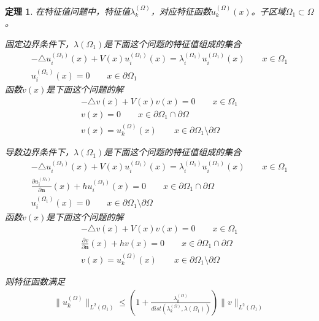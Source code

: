 \documentclass[12pt,a4paper]{article}
\newtheorem{theorem}{定理}
\begin{document}
\begin{theorem}

在特征值问题中，特征值$\lambda_k^{(\Omega)}$，对应特征函数$u_k^{(\Omega)}(x)$。子区域$\Omega_1 \subset \Omega$。

固定边界条件下，$\lambda(\Omega_1)$是下面这个问题的特征值组成的集合
\begin{align}
-\triangle u_i^{(\Omega_1)}(x) + V(x) u_i^{(\Omega_1)}(x) = \lambda_i^{(\Omega_1)} u_i^{(\Omega_1)}(x) \qquad x \in \Omega_1 \\
u_i^{(\Omega_1)}(x) = 0 \qquad x \in \partial \Omega_1
\end{align}
函数$v(x)$是下面这个问题的解
\begin{align}
-\triangle v(x) + V(x) v(x) = 0 \qquad x \in \Omega_1 \\
v(x) = 0 \qquad x \in \partial \Omega_1 \cap \partial \Omega \\
v(x) = u_k^{(\Omega)}(x) \qquad x \in \partial \Omega_1 \setminus \partial \Omega
\end{align}

导数边界条件下，$\lambda(\Omega_1)$是下面这个问题的特征值组成的集合
\begin{align}
-\triangle u_i^{(\Omega_1)}(x) + V(x) u_i^{(\Omega_1)}(x) = \lambda_i^{(\Omega_1)} u_i^{(\Omega_1)}(x) \qquad x \in \Omega_1 \\
\frac{\partial u_i^{(\Omega_1)}}{\partial \mathbf{n}}(x) + h u_i^{(\Omega_1)}(x) = 0 \qquad x \in \partial \Omega_1 \cap \partial \Omega \\
u_i^{(\Omega_1)}(x) = 0 \qquad x \in \partial \Omega_1 \setminus \partial \Omega
\end{align}
函数$v(x)$是下面这个问题的解
\begin{align}
-\triangle v(x) + V(x) v(x) = 0 \qquad x \in \Omega_1 \\
\frac{\partial v}{\partial \mathbf{n}}(x) + h v(x) = 0 \qquad x \in \partial \Omega_1 \cap \partial \Omega \\
v(x) = u_k^{(\Omega)}(x) \qquad x \in \partial \Omega_1 \setminus \partial \Omega
\end{align}

则特征函数满足
\begin{align}
\|u_k^{(\Omega)}\|_{L^2(\Omega_1)} \leq (1 + \frac{\lambda_k^{(\Omega)}}{dist(\lambda_k^{(\Omega)}, \lambda(\Omega_1))}) \|v\|_{L^2(\Omega_1)}
\end{align}

\end{theorem}
\end{document}
